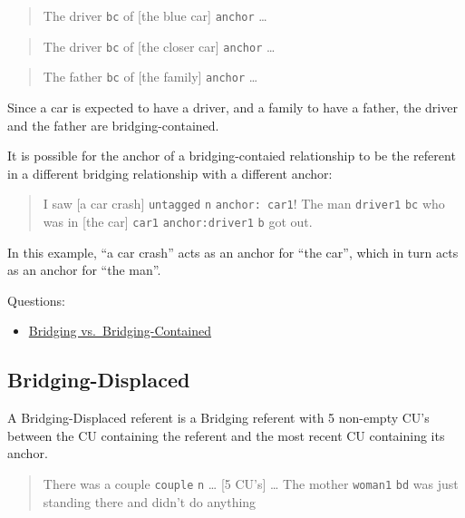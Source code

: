 \documentclass[
]{book}
\providecommand{\tightlist}{%
  \setlength{\itemsep}{0pt}\setlength{\parskip}{0pt}}
\begin{document}
\begin{quote}
The driver \texttt{bc} of {[}the blue car{]} \texttt{anchor} \ldots{}
\end{quote}

\begin{quote}
The driver \texttt{bc} of {[}the closer car{]} \texttt{anchor} \ldots{}
\end{quote}

\begin{quote}
The father \texttt{bc} of {[}the family{]} \texttt{anchor} \ldots{}
\end{quote}

Since a car is expected to have a driver, and a family to have a father,
the driver and the father are bridging-contained.

It is possible for the anchor of a bridging-contaied relationship to be the referent in a different bridging relationship
with a different anchor:

\begin{quote}
I saw {[}a car crash{]} \texttt{untagged} \texttt{n} \texttt{anchor:\ car1}!
The man \texttt{driver1} \texttt{bc} who was in {[}the car{]} \texttt{car1} \texttt{anchor:driver1} \texttt{b} got out.
\end{quote}

In this example, ``a car crash'' acts as an anchor for ``the car'',
which in turn acts as an anchor for ``the man''.

Questions:

\begin{itemize}
\tightlist
\item
  \protect\hyperlink{bridging-vs.-bridging-contained}{Bridging vs.~Bridging-Contained}
\end{itemize}

\hypertarget{bridging-displaced}{%
\subsection{Bridging-Displaced}\label{bridging-displaced}}

A Bridging-Displaced referent is a Bridging referent with 5 non-empty CU's between the CU containing the referent and the most recent CU containing its anchor.

\begin{quote}
There was a couple \texttt{couple} \texttt{n} \ldots{}
{[}5 CU's{]} \ldots{}
The mother \texttt{woman1} \texttt{bd} was just standing there and didn't do anything
\end{quote}
\end{document}
